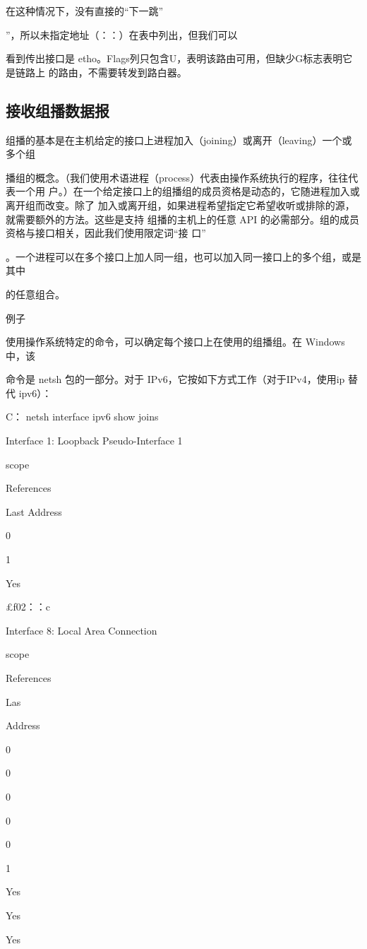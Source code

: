 在这种情况下，没有直接的“下一跳”

”，所以未指定地址（：：）在表中列出，但我们可以

看到传出接口是 etho。Flags列只包含U，表明该路由可用，但缺少G标志表明它是链路上
的路由，不需要转发到路白器。

\subsection{接收组播数据报}
组播的基本是在主机给定的接口上进程加入（joining）或离开（leaving）一个或多个组

播组的概念。（我们使用术语进程（process）代表由操作系统执行的程序，往往代表一个用
户。）在一个给定接口上的组播组的成员资格是动态的，它随进程加入或离开组而改变。除了
加入或离开组，如果进程希望指定它希望收听或排除的源，就需要额外的方法。这些是支持
组播的主机上的任意 API 的必需部分。组的成员资格与接口相关，因此我们使用限定词“接
口”

。一个进程可以在多个接口上加人同一组，也可以加入同一接口上的多个组，或是其中

的任意组合。

例子

使用操作系统特定的命令，可以确定每个接口上在使用的组播组。在 Windows 中，该

命令是 netsh 包的一部分。对于 IPv6，它按如下方式工作（对于IPv4，使用ip 替代 ipv6）：

C：\> netsh interface ipv6 show joins

Interface 1: Loopback Pseudo-Interface 1

scope

References

Last Address

0

1

Yes

£f02：：c

Interface 8: Local Area Connection

scope

References

Las

Address

0

0

0

0

0

1

Yes

Yes

Yes

